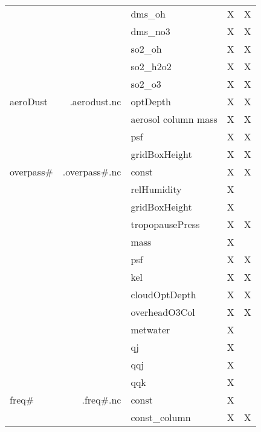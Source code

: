 \begin{center}
\begin{longtable}{|l|r|l|l|l|}
      &             &  dms\_oh          & X    &    X      \\
      &             &  dms\_no3         & X    &    X      \\
      &             &  so2\_oh          & X    &    X      \\
      &             &  so2\_h2o2        & X    &    X      \\ 
      &             &  so2\_o3          & X    &    X      \\ \hline
%
aeroDust     & .aerodust.nc     & optDepth    & X    &    X     \\    
             &                  &aerosol column mass& X    &    X     \\
             &                  &psf                & X    &    X     \\ 
             &                  &gridBoxHeight      & X    &    X     \\ \hline
%
overpass$\#$ & .overpass$\#$.nc & const        & X    &    X     \\
             &                  & relHumidity  & X    &          \\
             &                  & gridBoxHeight& X    &          \\
             &                  & tropopausePress& X    &    X     \\
             &                  & mass         & X    &          \\
             &                  & psf          & X    &    X     \\
             &                  & kel          & X    &    X     \\
             &                  & cloudOptDepth& X    &    X     \\
             &                  & overheadO3Col& X    &    X     \\
             &                  & metwater     & X    &          \\
             &                  & qj           & X    &          \\
             &                  & qqj          & X    &          \\ 
             &                  & qqk          & X    &          \\ \hline
freq$\#$     &  .freq$\#$.nc    & const        & X    &          \\
             &                  & const\_column& X    &     X    \\

\end{longtable}
\end{center}
